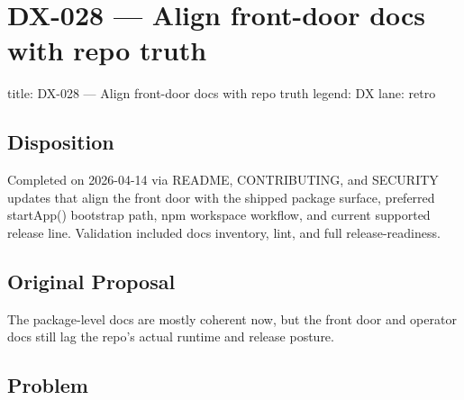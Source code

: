 \chapter{DX-028 --- Align front-door docs with repo truth}\label{record-334}

\smallskip

\begin{RecordMeta}
title: DX-028 — Align front-door docs with repo truth
legend: DX
lane: retro

\end{RecordMeta}

\section{Disposition}\label{record-334-disposition}

Completed on 2026-04-14 via README, CONTRIBUTING, and SECURITY updates that align the front door with the shipped package surface, preferred startApp() bootstrap path, npm workspace workflow, and current supported release line. Validation included docs inventory, lint, and full release-readiness.

\section{Original Proposal}\label{record-334-original-proposal}

The package-level docs are mostly coherent now, but the front door and operator docs still lag the repo's actual runtime and release posture.

\section{Problem}\label{record-334-problem}

